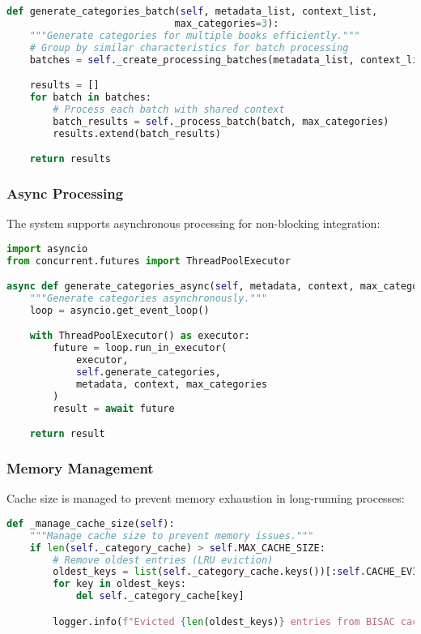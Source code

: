 \documentclass{article}
\begin{document}
\begin{lstlisting}[language=python, caption=Batch Processing Support]
def generate_categories_batch(self, metadata_list, context_list,
                             max_categories=3):
    """Generate categories for multiple books efficiently."""
    # Group by similar characteristics for batch processing
    batches = self._create_processing_batches(metadata_list, context_list)

    results = []
    for batch in batches:
        # Process each batch with shared context
        batch_results = self._process_batch(batch, max_categories)
        results.extend(batch_results)

    return results
\end{lstlisting}

\subsubsection{Async Processing}
The system supports asynchronous processing for non-blocking integration:

\begin{lstlisting}[language=python, caption=Asynchronous Processing]
import asyncio
from concurrent.futures import ThreadPoolExecutor

async def generate_categories_async(self, metadata, context, max_categories=3):
    """Generate categories asynchronously."""
    loop = asyncio.get_event_loop()

    with ThreadPoolExecutor() as executor:
        future = loop.run_in_executor(
            executor,
            self.generate_categories,
            metadata, context, max_categories
        )
        result = await future

    return result
\end{lstlisting}

\subsubsection{Memory Management}
Cache size is managed to prevent memory exhaustion in long-running processes:

\begin{lstlisting}[language=python, caption=Cache Management]
def _manage_cache_size(self):
    """Manage cache size to prevent memory issues."""
    if len(self._category_cache) > self.MAX_CACHE_SIZE:
        # Remove oldest entries (LRU eviction)
        oldest_keys = list(self._category_cache.keys())[:self.CACHE_EVICTION_COUNT]
        for key in oldest_keys:
            del self._category_cache[key]

        logger.info(f"Evicted {len(oldest_keys)} entries from BISAC cache")
\end{lstlisting}
\end{document}
